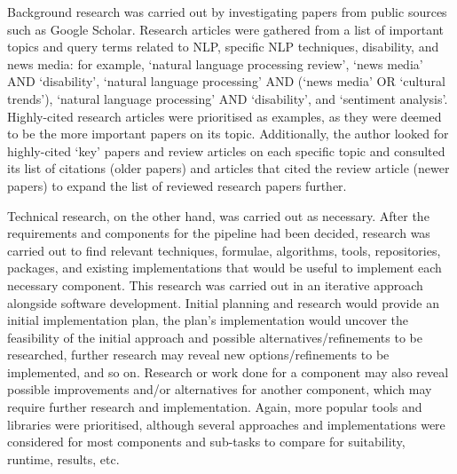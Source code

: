 \documentclass{report}
\begin{document}
Background research was carried out by investigating papers from public sources such as Google Scholar.
Research articles were gathered from a list of important topics and query terms related to NLP, specific NLP techniques, disability, and news media: for example, `natural language processing review', `news media' AND `disability', `natural language processing' AND (`news media' OR `cultural trends'), `natural language processing' AND `disability', and `sentiment analysis'.
Highly-cited research articles were prioritised as examples, as they were deemed to be the more important papers on its topic.
Additionally, the author looked for highly-cited `key' papers and review articles on each specific topic and consulted its list of citations (older papers) and articles that cited the review article (newer papers) to expand the list of reviewed research papers further.

Technical research, on the other hand, was carried out as necessary.
After the requirements and components for the pipeline had been decided, research was carried out to find relevant techniques, formulae, algorithms, tools, repositories, packages, and existing implementations that would be useful to implement each necessary component.
This research was carried out in an iterative approach alongside software development. 
Initial planning and research would provide an initial implementation plan, the plan's implementation would uncover the feasibility of the initial approach and possible alternatives/refinements to be researched, further research may reveal new options/refinements to be implemented, and so on.
Research or work done for a component may also reveal possible improvements and/or alternatives for another component, which may require further research and implementation.  
Again, more popular tools and libraries were prioritised, although several approaches and implementations were considered for most components and sub-tasks to compare for suitability, runtime, results, etc.
\end{document}

